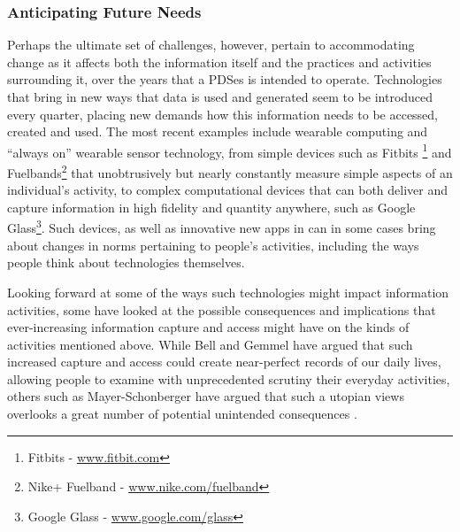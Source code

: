 \documentclass{acm_proc_article-sp}
\begin{document}
\subsubsection{Anticipating Future Needs}
Perhaps the ultimate set of challenges, however, pertain to accommodating change as it affects both the information itself and the practices and activities surrounding it, over the years that a PDSes is intended to operate.  Technologies that bring in new ways that data is used and generated seem to be introduced every quarter, placing new demands how this information needs to be accessed, created and used.  The most recent examples include wearable computing and ``always on'' wearable sensor technology, from simple devices such as Fitbits \footnote{Fitbits - \url{www.fitbit.com}} and Fuelbands\footnote{Nike+ Fuelband - \url{www.nike.com/fuelband}} that unobtrusively but nearly constantly measure simple aspects of an individual's activity, to complex computational devices that can both deliver and capture information in high fidelity and quantity anywhere, such as Google Glass\footnote{Google Glass - \url{www.google.com/glass}}.  Such devices, as well as innovative new apps in can in some cases bring about changes in norms pertaining to people's activities, including the ways people think about technologies themselves.


Looking forward at some of the ways such technologies might impact information activities, some have looked at the possible consequences and implications that ever-increasing information capture and access might have on the kinds of activities mentioned above. While Bell and Gemmel have argued \cite{bell2010total} that such increased capture and access could create near-perfect records of our daily lives, allowing people to examine with unprecedented scrutiny their everyday activities, others such as Mayer-Schonberger have argued that such a utopian views overlooks a great number of potential unintended consequences \cite{mayer-schonberger2013}.  

\end{document}
